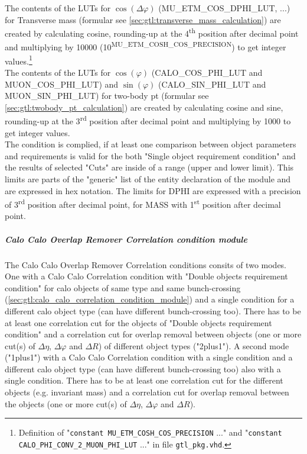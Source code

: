 The contents of the LUTs for $\cos(\Delta\varphi)$ (\small{MU\_ETM\_COS\_DPHI\_LUT}\normalsize, ...) for Transverse mass (formular see \ref{sec:gtl:transverse_mass_calculation}) 
are created by calculating cosine, rounding-up at the 4\textsuperscript{th} 
position after decimal point and multiplying by 10000 (10\textsuperscript{\tiny{MU\_ETM\_COSH\_COS\_PRECISION}}\normalsize) to get integer values.\footnote{Definition of 
"\texttt{constant \small{MU\_ETM\_COSH\_COS\_PRECISION}\normalsize} ..." and "\texttt{constant \small{CALO\_PHI\_CONV\_2\_MUON\_PHI\_LUT}\normalsize} ..." in file \texttt{gtl\_pkg.vhd}.}\\
The contents of the LUTs for $\cos(\varphi)$ (\small{CALO\_COS\_PHI\_LUT and MUON\_COS\_PHI\_LUT}\normalsize) and $\sin(\varphi)$ (\small{CALO\_SIN\_PHI\_LUT and MUON\_SIN\_PHI\_LUT}\normalsize) for two-body pt 
(formular see \ref{sec:gtl:twobody_pt_calculation}) are created by calculating cosine and sine, rounding-up at the 3\textsuperscript{rd} position after decimal point and multiplying by 1000 to get integer values.\\
The condition is complied, if at least one comparison between object parameters and requirements is valid for the both "Single object requirement condition"
and the results of selected "Cuts" are inside of a range (upper and lower limit).
This limits are parts of the "generic" list of the entity declaration of the module and are expressed in hex notation. The limits for DPHI
are expressed with a precision of 3\textsuperscript{rd} position after decimal point, for MASS with 1\textsuperscript{st} position after decimal point.

\subparagraph{Calo Calo Overlap Remover Correlation condition module}
\label{sec:gtl:calo_calo_overlap_remover_condition_module}

The Calo Calo Overlap Remover Correlation conditions consits of two modes. One with a Calo Calo Correlation condition with "Double objects requirement condition" for calo objects of same type and same bunch-crossing (\ref{sec:gtl:calo_calo_correlation_condition_module}) and a single condition for a different calo object type (can have different bunch-crossing too). There has to be at least one correlation cut for the objects of "Double objects requirement condition" and a correlation cut for overlap removal between objects (one or more cut(s) of $\Delta\eta$, $\Delta\varphi$ and $\Delta$$R$)
of different object types ("2plus1"). A second mode ("1plus1") with a Calo Calo Correlation condition with a single condition and a different calo object type (can have different bunch-crossing too) also with a single condition. There has to be at least one correlation cut for the different objects (e.g. invariant mass) and a correlation cut for overlap removal between the objects (one or more cut(s) of $\Delta\eta$, $\Delta\varphi$ and $\Delta$$R$). 


